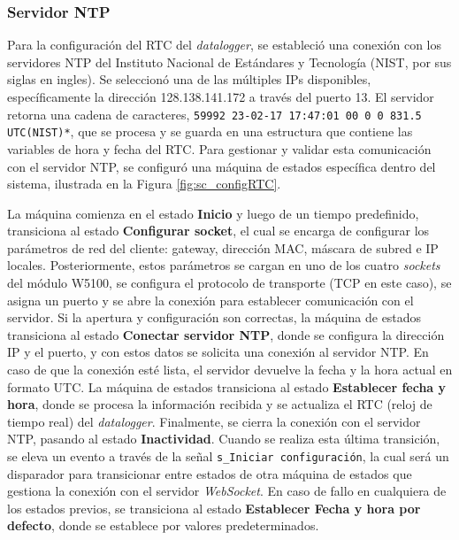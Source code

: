\subsubsection{Servidor NTP}\label{sec:serverNTP}
Para la configuración del RTC del \textit{datalogger}, se estableció una conexión con los servidores NTP del Instituto Nacional de Estándares y Tecnología (NIST, por sus siglas en ingles). Se seleccionó una de las múltiples IPs disponibles, específicamente la dirección 128.138.141.172 a través del puerto 13. El servidor retorna una cadena de caracteres, \texttt{59992 23-02-17 17:47:01 00 0 0 831.5 UTC(NIST)*}, que se procesa y se guarda en una estructura que contiene las variables de hora y fecha del RTC. Para gestionar y validar esta comunicación con el servidor NTP, se configuró una máquina de estados específica dentro del sistema, ilustrada en la Figura \ref{fig:sc_configRTC}.




La máquina comienza en el estado \textbf{Inicio} y luego de un tiempo predefinido, transiciona al estado \textbf{Configurar socket}, el cual se encarga de configurar los parámetros de red del cliente: gateway, dirección MAC, máscara de subred e IP locales. Posteriormente, estos parámetros se cargan en uno de los cuatro \textit{sockets} del módulo W5100, se configura el protocolo de transporte (TCP en este caso), se asigna un puerto y se abre la conexión para establecer comunicación con el servidor. Si la apertura y configuración son correctas, la máquina de estados transiciona al estado \textbf{Conectar servidor NTP}, donde se configura la dirección IP y el puerto, y con estos datos se solicita una conexión al servidor NTP. En caso de que la conexión esté lista, el servidor devuelve la fecha y la hora actual en formato UTC. La máquina de estados transiciona al estado \textbf{Establecer fecha y hora}, donde se procesa la información recibida y se actualiza el RTC (reloj de tiempo real) del \textit{datalogger}. Finalmente, se cierra la conexión con el servidor NTP, pasando al estado \textbf{Inactividad}. Cuando se realiza esta última transición, se eleva un evento a través de la señal \texttt{s\_Iniciar configuración}, la cual será un disparador para transicionar entre estados de otra máquina de estados que gestiona la conexión con el servidor \textit{WebSocket}. En caso de fallo en cualquiera de los estados previos, se transiciona al estado \textbf{Establecer Fecha y hora por defecto}, donde se establece por valores predeterminados.

